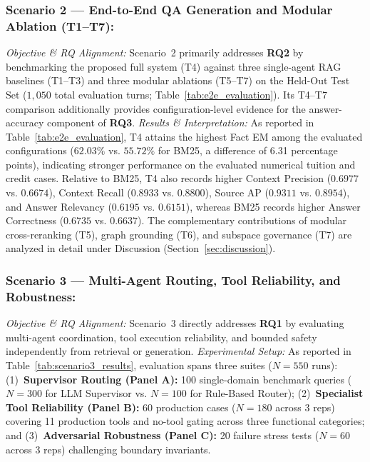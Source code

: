 \subsubsection{Scenario 2 --- End-to-End QA Generation and Modular Ablation (T1--T7):}
\emph{Objective \& RQ Alignment:} Scenario~2 primarily addresses \textbf{RQ2} by benchmarking the proposed full system (T4) against three single-agent RAG baselines (T1--T3) and three modular ablations (T5--T7) on the Held-Out Test Set ($1,050$ total evaluation turns; Table~\ref{tab:e2e_evaluation}). Its T4--T7 comparison additionally provides configuration-level evidence for the answer-accuracy component of \textbf{RQ3}.
\emph{Results \& Interpretation:} As reported in Table~\ref{tab:e2e_evaluation}, T4 attains the highest Fact EM among the evaluated configurations ($62.03\%$ vs. $55.72\%$ for BM25, a difference of 6.31 percentage points), indicating stronger performance on the evaluated numerical tuition and credit cases. Relative to BM25, T4 also records higher Context Precision ($0.6977$ vs. $0.6674$), Context Recall ($0.8933$ vs. $0.8800$), Source AP ($0.9311$ vs. $0.8954$), and Answer Relevancy ($0.6195$ vs. $0.6151$), whereas BM25 records higher Answer Correctness ($0.6735$ vs. $0.6637$). The complementary contributions of modular cross-reranking (T5), graph grounding (T6), and subspace governance (T7) are analyzed in detail under Discussion (Section~\ref{sec:discussion}).

\subsubsection{Scenario 3 --- Multi-Agent Routing, Tool Reliability, and Robustness:}
\emph{Objective \& RQ Alignment:} Scenario~3 directly addresses \textbf{RQ1} by evaluating multi-agent coordination, tool execution reliability, and bounded safety independently from retrieval or generation.
\emph{Experimental Setup:} As reported in Table~\ref{tab:scenario3_results}, evaluation spans three suites ($N=550$ runs): (1)~\textbf{Supervisor Routing (Panel A):} 100 single-domain benchmark queries ($N=300$ for LLM Supervisor vs. $N=100$ for Rule-Based Router); (2)~\textbf{Specialist Tool Reliability (Panel B):} 60 production cases ($N=180$ across 3 reps) covering 11 production tools and no-tool gating across three functional categories; and (3)~\textbf{Adversarial Robustness (Panel C):} 20 failure stress tests ($N=60$ across 3 reps) challenging boundary invariants.

